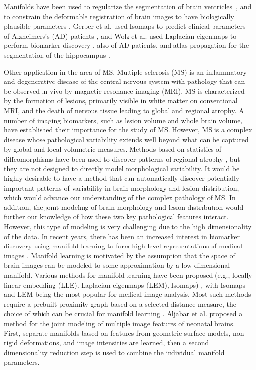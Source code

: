 
Manifolds have been used to regularize the segmentation of brain
ventricles~\citep{etyngier2007}, and to constrain the deformable registration of
brain images to have biologically plausible parameters \citep{hamm2010}. Gerber
et al. used Isomaps to predict clinical parameters of Alzheimers's (AD) patients
\citep{gerber2010}, and Wolz et al. used Laplacian eigenmaps to perform
biomarker discovery \citep{wolz2011}, also of AD patients, and atlas propagation
for the segmentation of the hippocampus \citep{wolz2010}.


Other application in the area of MS. Multiple sclerosis (MS) is an inflammatory
and degenerative disease of the central nervous system with pathology that can
be observed in vivo by magnetic resonance imaging (MRI). MS is characterized by
the formation of lesions, primarily visible in white matter on conventional MRI,
and the death of nervous tissue leading to global and regional atrophy. A number
of imaging biomarkers, such as lesion volume and whole brain volume, have
established their importance for the study of MS. However, MS is a complex
disease whose pathological variability extends well beyond what can be captured
by global and local volumetric measures. Methods based on statistics of
diffeomorphisms have been used to discover patterns of regional atrophy
\cite{Ceccarelli2012}, but they are not designed to directly model morphological
variability. It would be highly desirable to have a method that can
automatically discover potentially important patterns of variability in brain
morphology and lesion distribution, which would advance our understanding of the
complex pathology of MS. In addition, the joint modeling of brain morphology and
lesion distribution would further our knowledge of how these two key
pathological features interact. However, this type of modeling is very
challenging due to the high dimensionality of the data. In recent years, there
has been an increased interest in biomarker discovery using manifold learning to
form high-level representations of medical images
\cite{Wolz2010b,AljabarRueckert2011,Wolz2012}. Manifold learning is motivated by
the assumption that the space of brain images can be modeled to some
approximation by a low-dimensional manifold. Various methods for manifold
learning have been proposed (e.g., locally linear embedding (LLE), Laplacian
eigenmaps (LEM), Isomaps) \cite{Cayton2005}, with Isomaps and LEM being the most
popular for medical image analysis. Most such methods require a prebuilt
proximity graph based on a selected distance measure, the choice of which can be
crucial for manifold learning \cite{Gerber2010}. Aljabar et al. proposed a
method \cite{AljabarRueckert2011} for the joint modeling of multiple image
features of neonatal brains. First, separate manifolds based on features from
geometric surface models, non-rigid deformations, and image intensities are
learned, then a second dimensionality reduction step is used to combine the
individual manifold parameters.


